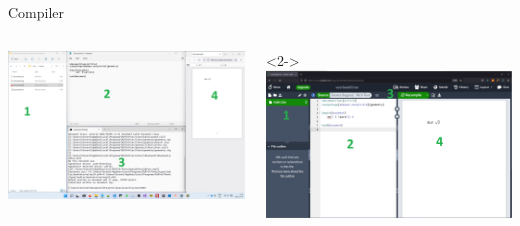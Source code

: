 \copyrightVincent

\begin{frame}[fragile]{Compiler}
    \centering

    \begin{columns}
        \begin{column}{0.5\textwidth}
            \includegraphics[width=\linewidth,height=0.8\textheight,keepaspectratio]
            {assets/manual_compile_parts.png}
        \end{column}
        \begin{column}{0.5\textwidth}
            \begin{onlyenv}<2->%
                \includegraphics[width=\linewidth,height=0.8\textheight,keepaspectratio]
                {assets/overleaf_compile_parts.png}%
            \end{onlyenv}
        \end{column}
    \end{columns}
\end{frame}

